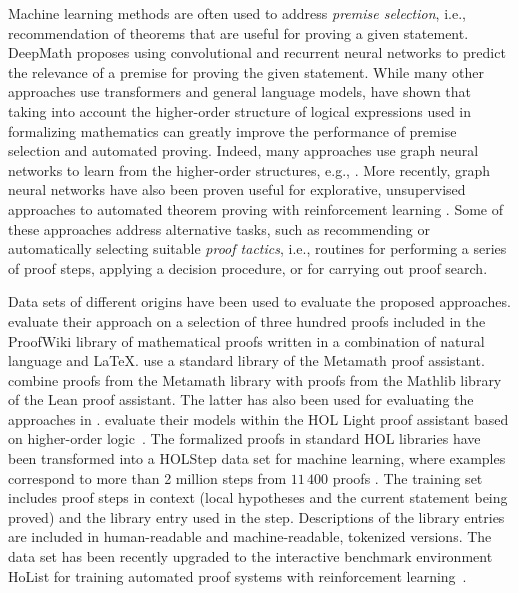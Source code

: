 \documentclass{article}
\begin{document}
Machine learning methods are often used to address \emph{premise selection}, i.e., recommendation of theorems that are useful for proving a given statement. DeepMath \citep{alemi16} proposes using convolutional and recurrent neural networks to predict the relevance of a premise for proving the given statement. While many other approaches \citep{polu20,welleck22} use transformers and general language models, \citet{paliwal20} have shown that taking into account the higher-order structure of logical expressions used in formalizing mathematics can greatly improve the performance of premise selection and automated proving. Indeed, many approaches use graph neural networks to learn from the higher-order structures, e.g., \citep{wang17}. More recently, graph neural networks have also been proven useful for explorative, unsupervised approaches to automated theorem proving with reinforcement learning \citep{bansal20,lample22}. Some of these approaches address alternative tasks, such as recommending or automatically selecting suitable \emph{proof tactics}, i.e., routines for performing a series of proof steps, applying a decision procedure, or for carrying out proof search.

Data sets of different origins have been used to evaluate the proposed approaches. \citet{welleck22} evaluate their approach on a selection of three hundred proofs included in the ProofWiki \citep{proofwiki} library of mathematical proofs written in a combination of natural language and \LaTeX{}.  \citet{polu20} use a standard library of the Metamath proof assistant. \citet{lample22} combine proofs from the Metamath library with proofs from the Mathlib library \citep{mathlib} of the Lean proof assistant. The latter has also been used for evaluating the approaches in \citep{han22}. \citet{wang17,paliwal20,bansal20} evaluate their models within the HOL Light proof assistant based on higher-order logic~\citep{harrison09}. The formalized proofs in standard HOL libraries have been transformed into a HOLStep data set for machine learning, where examples correspond to more than 2 million steps from $11\,400$ proofs \citep{kaliszyk17}. The training set includes proof steps in context (local hypotheses and the current statement being proved) and the library entry used in the step. Descriptions of the library entries are included in human-readable and machine-readable, tokenized versions. The data set has been recently upgraded to the interactive benchmark environment HoList for training automated proof systems with reinforcement learning~\citep{bansal19}.
\end{document}
